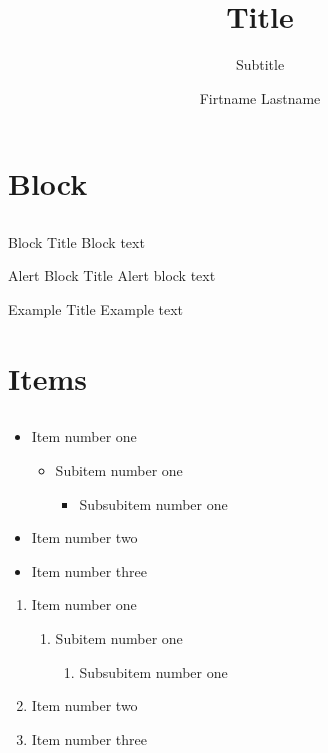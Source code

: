\documentclass[12pt,a4paper]{beamer}
\title{Title}
\author{Firtname Lastname}
\subtitle{Subtitle}
\institute{Institue}
\begin{document}
\begin{frame}[plain]
	\maketitle
\end{frame}

\section{Block}
\subsection{}
\begin{frame}
	\begin{block}{Block Title}
		Block text
	\end{block}
	\begin{alertblock}{Alert Block Title}
		Alert block text
	\end{alertblock}
	\begin{example}{Example Title}
		Example text
	\end{example}
\end{frame}

\section{Items}
\subsection{}
\begin{frame}
	\begin{itemize}
		\item Item number one
		\begin{itemize}
			\item Subitem number one
			\begin{itemize}
				\item Subsubitem number one
			\end{itemize}
		\end{itemize}
		\item Item number two
		\item Item number three
	\end{itemize}
	\begin{enumerate}
		\item Item number one
		\begin{enumerate}
			\item Subitem number one
			\begin{enumerate}
				\item Subsubitem number one
			\end{enumerate}
		\end{enumerate}
		\item Item number two
		\item Item number three
	\end{enumerate}
\end{frame}
\end{document}
